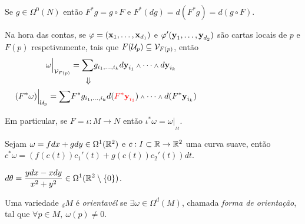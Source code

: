 \begin{example}
    Se \(g \in \Omega^0(N)\) então \(F^*g = g \circ F\) e \(F^*(dg) = d(F^*g) = d (g\circ F)\).   
\end{example}


\vspace{-1cm}

\begin{note}
    Na hora das contas, se \(\varphi = (\textbf{x}_1, \ldots, \textbf{x}_{d_1})\) e \(\varphi{'}(\textbf{y}_1, \ldots, \textbf{y}_{d_2})\) são cartas locais de \(p\) e \(F(p)\) respetivamente, tais que \(F(\mathcal{U}_p)\subseteq \mathcal{V}_{F(p)}\), então 
    \begin{align*}
        \omega\Big|_{\mathcal{V}_{F(p)}} &=  \underset{\rotatebox{-90}{$\Rightarrow$}}{\sum} g_{i_1, \ldots, i_k} d\y_{i_1} \wedge \cdots \wedge d\y_{i_k} \\  
        (F^*\omega )\Big|_{\U_p} = \sum &F^*g_{i_1, \ldots, i_k} d(\textcolor{red}{F^*\y_{i_1}} ) \wedge \cdots \wedge d(F^*\y_{i_k})  \hspace{4cm}
    \end{align*}
\end{note}
 
Em particular, se \(F = \iota: M \to N\) então \(\iota^*\omega = \omega|_{_M}\).

\begin{example}
    Sejam \( \omega = fdx + g dy \in \Omega^1(\mathbb{R}^2)\) e \(c: I\subset \mathbb{R} \to \mathbb{R}^2\) uma curva suave, então \(c^*\omega = (f(c(t))c_1{'}(t) + g(c(t))c_2{'}(t)) dt\).  
\end{example}

\begin{example}
    \(\displaystyle d\theta = \frac{y dx - xdy }{x^2+ y^2} \in \Omega^1(\mathbb{R}^2\setminus\{0\})\). 
\end{example}


\begin{definition}
    Uma variedade \(_dM\) é \emph{orientavél} se \(\exists \omega \in \Omega^d(M)\), chamada \emph{forma de orientação}, tal que \(\forall p \in M, \ \omega(p)\neq 0 \). 
\end{definition}


